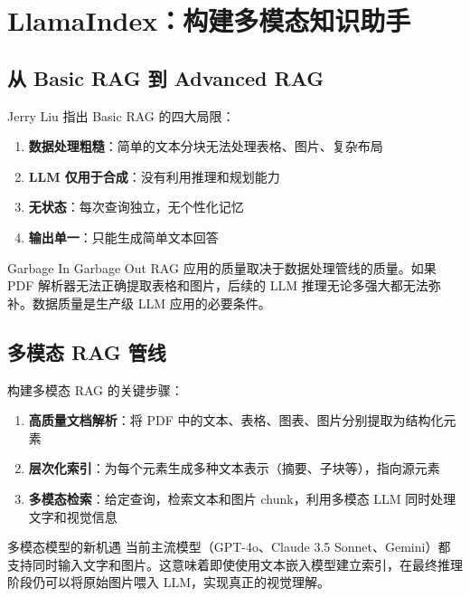 \section{LlamaIndex：构建多模态知识助手}

\subsection{从 Basic RAG 到 Advanced RAG}

Jerry Liu 指出 Basic RAG 的四大局限：
\begin{enumerate}
    \item \textbf{数据处理粗糙}：简单的文本分块无法处理表格、图片、复杂布局
    \item \textbf{LLM 仅用于合成}：没有利用推理和规划能力
    \item \textbf{无状态}：每次查询独立，无个性化记忆
    \item \textbf{输出单一}：只能生成简单文本回答
\end{enumerate}

\begin{warningbox}{Garbage In Garbage Out}
RAG 应用的质量取决于数据处理管线的质量。如果 PDF 解析器无法正确提取表格和图片，后续的 LLM 推理无论多强大都无法弥补。数据质量是生产级 LLM 应用的必要条件。
\end{warningbox}

\subsection{多模态 RAG 管线}

构建多模态 RAG 的关键步骤：

\begin{enumerate}
    \item \textbf{高质量文档解析}：将 PDF 中的文本、表格、图表、图片分别提取为结构化元素
    \item \textbf{层次化索引}：为每个元素生成多种文本表示（摘要、子块等），指向源元素
    \item \textbf{多模态检索}：给定查询，检索文本和图片 chunk，利用多模态 LLM 同时处理文字和视觉信息
\end{enumerate}

\begin{knowledgebox}{多模态模型的新机遇}
当前主流模型（GPT-4o、Claude 3.5 Sonnet、Gemini）都支持同时输入文字和图片。这意味着即使使用文本嵌入模型建立索引，在最终推理阶段仍可以将原始图片喂入 LLM，实现真正的视觉理解。
\end{knowledgebox}

